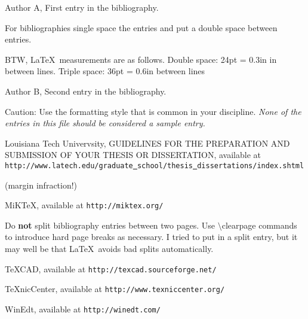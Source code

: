 

\begin{thebibliography}{99}
\setlength{\itemsep}{12pt}

Author A,
First entry in the bibliography.


For bibliographies single space the entries and put a double space between
entries.

BTW, \LaTeX \ measurements are
as follows. Double space: 24pt = 0.3in in between lines.
Triple space: 36pt = 0.6in between lines


Author B,
Second entry in the bibliography.

Caution:
Use the formatting style that is common in your discipline.
{\em None of the entries in this file should be considered a sample entry.}




Louisiana Tech Univervsity,
GUIDELINES FOR THE
PREPARATION AND SUBMISSION
OF YOUR THESIS OR DISSERTATION,
available at
{\tt http://www.latech.edu/graduate\underline{~}school/thesis\underline{~}dissertations/index.shtml}

(margin infraction!)


MiKTeX, available at
{\tt http://miktex.org/}


Do {\bf not} split bibliography entries between two pages.
Use $\setminus $clearpage commands to introduce hard page breaks
as necessary.
I tried to put in a split entry, but it may well be that
\LaTeX \ avoids bad splits automatically.


\TeX CAD, available at {\tt http://texcad.sourceforge.net/}



TeXnicCenter, available at
{\tt http://www.texniccenter.org/}

WinEdt, available at
{\tt http://winedt.com/}




\end{thebibliography}

